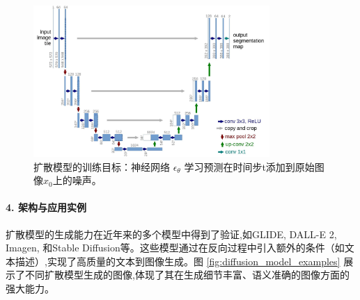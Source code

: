 \begin{itemize}
    \begin{figure}[H]
        \centering
        \includegraphics[width=0.8\textwidth]{figures/D3.png}
        \caption{扩散模型的训练目标：神经网络 $\epsilon_\theta$ 学习预测在时间步t添加到原始图像$x_0$上的噪声。}
        \label{fig:diffusion_training_objective}
    \end{figure}

    \paragraph{4. 架构与应用实例}
    扩散模型的生成能力在近年来的多个模型中得到了验证,如GLIDE, DALL-E 2, Imagen, 和Stable Diffusion等。这些模型通过在反向过程中引入额外的条件（如文本描述）,实现了高质量的文本到图像生成。图 \ref{fig:diffusion_model_examples} 展示了不同扩散模型生成的图像,体现了其在生成细节丰富、语义准确的图像方面的强大能力。


\end{itemize}

